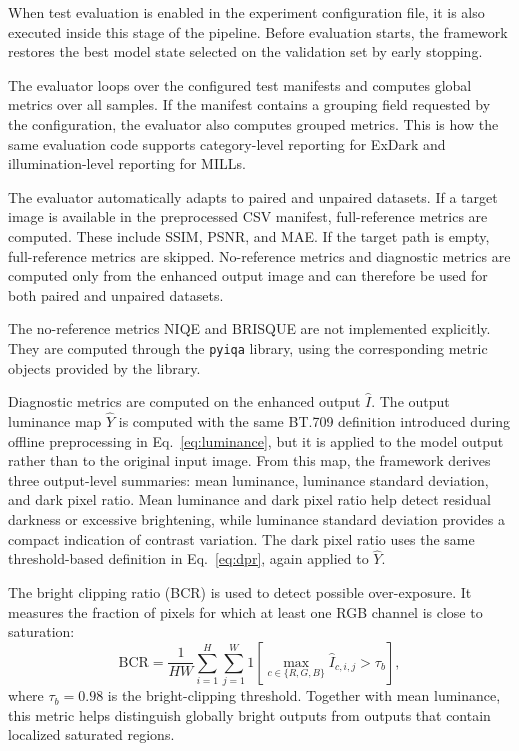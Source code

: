 When test evaluation is enabled in the experiment configuration file, it is also executed inside this stage of the pipeline. Before evaluation starts, the framework restores the best model state selected on the validation set by early stopping.

The evaluator loops over the configured test manifests and computes global metrics over all samples. If the manifest contains a grouping field requested by the configuration, the evaluator also computes grouped metrics. This is how the same evaluation code supports category-level reporting for ExDark and illumination-level reporting for MILLs.

The evaluator automatically adapts to paired and unpaired datasets. If a target image is available in the preprocessed CSV manifest, full-reference metrics are computed. These include SSIM, PSNR, and MAE. If the target path is empty, full-reference metrics are skipped. No-reference metrics and diagnostic metrics are computed only from the enhanced output image and can therefore be used for both paired and unpaired datasets.

The no-reference metrics NIQE and BRISQUE are not implemented explicitly. They are computed through the \texttt{pyiqa} library, using the corresponding metric objects provided by the library.

Diagnostic metrics are computed on the enhanced output $\hat{I}$. The output luminance map $\hat{Y}$ is computed with the same BT.709 definition introduced during offline preprocessing in Eq.~\ref{eq:luminance}, but it is applied to the model output rather than to the original input image. From this map, the framework derives three output-level summaries: mean luminance, luminance standard deviation, and dark pixel ratio. Mean luminance and dark pixel ratio help detect residual darkness or excessive brightening, while luminance standard deviation provides a compact indication of contrast variation. The dark pixel ratio uses the same threshold-based definition in Eq.~\ref{eq:dpr}, again applied to $\hat{Y}$.

The bright clipping ratio (BCR) is used to detect possible over-exposure. It measures the fraction of pixels for which at least one RGB channel is close to saturation:
\begin{equation}
	\mathrm{BCR}
	=
	\frac{1}{HW}
	\sum_{i=1}^{H}
	\sum_{j=1}^{W}
	1
	\left[
	\max_{c \in \{R,G,B\}}
	\hat{I}_{c,i,j} > \tau_b
	\right],
	\label{eq:bcr}
\end{equation}
where $\tau_b = 0.98$ is the bright-clipping threshold. Together with mean luminance, this metric helps distinguish globally bright outputs from outputs that contain localized saturated regions.

